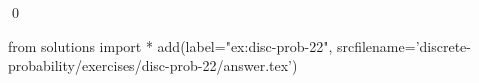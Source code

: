 
\begin{ex} 
  \label{ex:disc-prob-22}
  
  \qed
\end{ex} 
\begin{python0}
from solutions import *
add(label="ex:disc-prob-22",
    srcfilename='discrete-probability/exercises/disc-prob-22/answer.tex') 
\end{python0}
